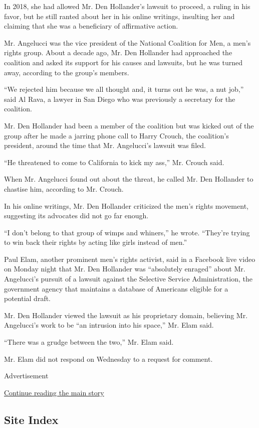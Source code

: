 In 2018, she had allowed Mr. Den Hollander's lawsuit to proceed, a
ruling in his favor, but he still ranted about her in his online
writings, insulting her and claiming that she was a beneficiary of
affirmative action.

Mr. Angelucci was the vice president of the National Coalition for Men,
a men's rights group. About a decade ago, Mr. Den Hollander had
approached the coalition and asked its support for his causes and
lawsuits, but he was turned away, according to the group's members.

``We rejected him because we all thought and, it turns out he was, a nut
job,'' said Al Rava, a lawyer in San Diego who was previously a
secretary for the coalition.

Mr. Den Hollander had been a member of the coalition but was kicked out
of the group after he made a jarring phone call to Harry Crouch, the
coalition's president, around the time that Mr. Angelucci's lawsuit was
filed.

``He threatened to come to California to kick my ass,'' Mr. Crouch said.

When Mr. Angelucci found out about the threat, he called Mr. Den
Hollander to chastise him, according to Mr. Crouch.

In his online writings, Mr. Den Hollander criticized the men's rights
movement, suggesting its advocates did not go far enough.

``I don't belong to that group of wimps and whiners,'' he wrote.
``They're trying to win back their rights by acting like girls instead
of men.''

Paul Elam, another prominent men's rights activist, said in a Facebook
live video on Monday night that Mr. Den Hollander was ``absolutely
enraged'' about Mr. Angelucci's pursuit of a lawsuit against the
Selective Service Administration, the government agency that maintains a
database of Americans eligible for a potential draft.

Mr. Den Hollander viewed the lawsuit as his proprietary domain,
believing Mr. Angelucci's work to be ``an intrusion into his space,''
Mr. Elam said.

``There was a grudge between the two,'' Mr. Elam said.

Mr. Elam did not respond on Wednesday to a request for comment.

Advertisement

\protect\hyperlink{after-bottom}{Continue reading the main story}

\hypertarget{site-index}{%
\subsection{Site Index}\label{site-index}}

